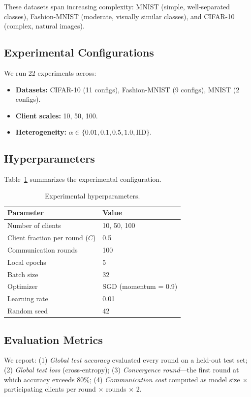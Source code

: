 \documentclass[journal]{IEEEtran}
\begin{document}
These datasets span increasing complexity: MNIST (simple, well-separated classes), Fashion-MNIST (moderate, visually similar classes), and CIFAR-10 (complex, natural images).

\subsection{Experimental Configurations}

We run 22 experiments across:
\begin{itemize}
    \item \textbf{Datasets:} CIFAR-10 (11 configs), Fashion-MNIST (9 configs), MNIST (2 configs).
    \item \textbf{Client scales:} 10, 50, 100.
    \item \textbf{Heterogeneity:} $\alpha \in \{0.01, 0.1, 0.5, 1.0, \text{IID}\}$.
\end{itemize}

\subsection{Hyperparameters}

Table~\ref{tab:hyperparams} summarizes the experimental configuration.

\begin{table}[h]
\centering
\caption{Experimental hyperparameters.}
\label{tab:hyperparams}
\begin{tabular}{ll}
\toprule
\textbf{Parameter} & \textbf{Value} \\
\midrule
Number of clients & 10, 50, 100 \\
Client fraction per round ($C$) & 0.5 \\
Communication rounds & 100 \\
Local epochs & 5 \\
Batch size & 32 \\
Optimizer & SGD (momentum = 0.9) \\
Learning rate & 0.01 \\
Random seed & 42 \\
\bottomrule
\end{tabular}
\end{table}

\subsection{Evaluation Metrics}

We report: (1) \textit{Global test accuracy} evaluated every round on a held-out test set; (2) \textit{Global test loss} (cross-entropy); (3) \textit{Convergence round}---the first round at which accuracy exceeds 80\%; (4) \textit{Communication cost} computed as model size $\times$ participating clients per round $\times$ rounds $\times$ 2.
\end{document}
